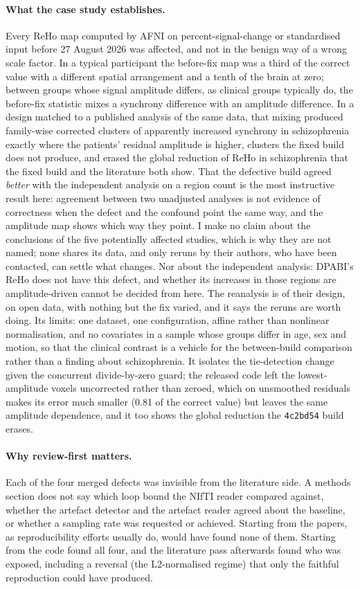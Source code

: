 \documentclass[11pt]{article}
\newcommand{\code}[1]{\texttt{#1}}
\begin{document}
\paragraph{What the case study establishes.} Every ReHo map computed by AFNI on percent-signal-change or standardised input before 27 August 2026 was affected, and not in the benign way of a wrong scale factor. In a typical participant the before-fix map was a third of the correct value with a different spatial arrangement and a tenth of the brain at zero; between groups whose signal amplitude differs, as clinical groups typically do, the before-fix statistic mixes a synchrony difference with an amplitude difference. In a design matched to a published analysis of the same data, that mixing produced family-wise corrected clusters of apparently increased synchrony in schizophrenia exactly where the patients' residual amplitude is higher, clusters the fixed build does not produce, and erased the global reduction of ReHo in schizophrenia that the fixed build and the literature both show. That the defective build agreed \emph{better} with the independent analysis on a region count is the most instructive result here: agreement between two unadjusted analyses is not evidence of correctness when the defect and the confound point the same way, and the amplitude map shows which way they point. I make no claim about the conclusions of the five potentially affected studies, which is why they are not named; none shares its data, and only reruns by their authors, who have been contacted, can settle what changes. Nor about the independent analysis: DPABI's ReHo does not have this defect, and whether its increases in those regions are amplitude-driven cannot be decided from here. The reanalysis is of their design, on open data, with nothing but the fix varied, and it says the reruns are worth doing. Its limits: one dataset, one configuration, affine rather than nonlinear normalisation, and no covariates in a sample whose groups differ in age, sex and motion, so that the clinical contrast is a vehicle for the between-build comparison rather than a finding about schizophrenia. It isolates the tie-detection change given the concurrent divide-by-zero guard; the released code left the lowest-amplitude voxels uncorrected rather than zeroed, which on unsmoothed residuals makes its error much smaller (0.81 of the correct value) but leaves the same amplitude dependence, and it too shows the global reduction the \code{4c2bd54} build erases.

\paragraph{Why review-first matters.} Each of the four merged defects was invisible from the literature side. A methods section does not say which loop bound the NIfTI reader compared against, whether the artefact detector and the artefact reader agreed about the baseline, or whether a sampling rate was requested or achieved. Starting from the papers, as reproducibility efforts usually do, would have found none of them. Starting from the code found all four, and the literature pass afterwards found who was exposed, including a reversal (the L2-normalised regime) that only the faithful reproduction could have produced.
\end{document}
